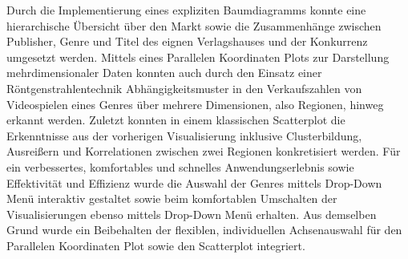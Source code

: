\documentclass[usegeometry=true]{scrartcl}
\begin{document}
Durch die Implementierung eines expliziten Baumdiagramms konnte eine hierarchische Übersicht über den Markt sowie die Zusammenhänge zwischen Publisher, Genre und Titel des eignen Verlagshauses und der Konkurrenz umgesetzt werden.
Mittels eines Parallelen Koordinaten Plots zur Darstellung mehrdimensionaler Daten konnten auch durch den Einsatz einer Röntgenstrahlentechnik 
Abhängigkeitsmuster in den Verkaufszahlen von Videospielen eines Genres über mehrere Dimensionen, also Regionen, hinweg erkannt werden.
Zuletzt konnten in einem klassischen Scatterplot die Erkenntnisse aus der vorherigen Visualisierung inklusive Clusterbildung, 
Ausreißern und Korrelationen zwischen zwei Regionen konkretisiert werden. 
Für ein verbessertes, komfortables und schnelles Anwendungserlebnis sowie Effektivität und Effizienz wurde die Auswahl der Genres mittels Drop-Down Menü interaktiv gestaltet 
sowie beim komfortablen Umschalten der Visualisierungen ebenso mittels Drop-Down Menü erhalten.
Aus demselben Grund wurde ein Beibehalten der flexiblen, individuellen Achsenauswahl für den Parallelen Koordinaten Plot sowie den Scatterplot integriert.
\end{document}
